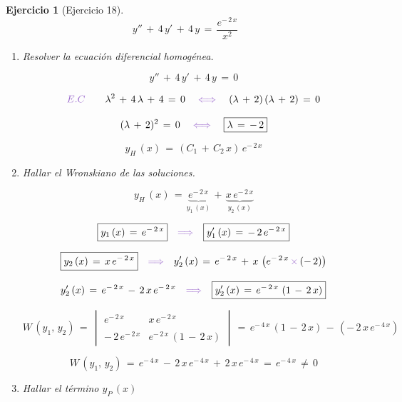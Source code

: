 \documentclass[a4paper,11pt, openany]{book}
\newtheorem{ejer}{Ejercicio}[section]
\newcommand*{\itembolasazules}[1]{%
\footnotesize\protect\tikz[baseline=-3pt]%
\protect\node[scale=.7, circle, shade, ball
color=green]{\color{white}\Large\bf#1};}
\begin{document}
\begin{ejer}[Ejercicio 18]

$$y''\,+\,4\,y'\,+\,4\,y\,=\,\dfrac{e^{-\,2\,x}}{x^{2}}$$
 
\begin{enumerate}[label=\itembolasazules{\arabic*}]
 
 
\item  Resolver la ecuación diferencial homogénea.
 
$$y''\,+\,4\,y'\,+\,4\,y\,=\,0$$
 
$$\textcolor{amethyst}{E.C} \qquad \lambda^{2}\,+\,4\,\lambda\,+\,4\,=\,0 \quad \textcolor{amethyst}{\iff} \quad (\lambda\,+\,2)\,(\lambda\,+\,2)\,=\,0$$
 
$$(\lambda\,+\,2)^{2}\,=\,0 \quad \textcolor{amethyst}{\iff} \quad
\boxed{\lambda\,=\,-\,2}$$
 
$$\boxed{y_{H}\,(x)\,=\,(C_{1}\,+\,C_{2}\,x)\,e^{-\,2\,x}}$$
 
\item Hallar el Wronskiano de las soluciones.
 
$$y_{H}\,(x)\,=\,\underbrace{e^{-\,2\,x}}_{y_{1}\,(x)}\,+\,\underbrace{x\,e^{-\,2\,x}}_{y_{2}\,(x)}$$
 
$$\boxed{y_{1}\,(x)\,=\,e^{-\,2\,x}} \quad \textcolor{amethyst}{\Longrightarrow} \quad \boxed{y_{1}'\,(x)\,=\,-\,2\,e^{-\,2\,x}}$$
 
$$\boxed{y_{2}\,(x)\,=\,x\,e^{-\,2\,x}} \quad \textcolor{amethyst}{\Longrightarrow} \quad y_{2}'\,(x)\,=\,e^{-\,2\,x}\,+\,x\,\left(e^{-\,2\,x}\,\textcolor{amethyst}{\times}\,(-\,2) \right) $$
 
$$y_{2}'\,(x)\,=\,e^{-\,2\,x}\,-\,2\,x\,e^{-\,2\,x} \quad \textcolor{amethyst}{\Longrightarrow} \quad \boxed{y_{2}'\,(x)\,=\,e^{-\,2\,x}\,\left(1\,-\,2\,x \right)}$$
 
$$W\,\left(y_{1},\,y_{2} \right)\,=\,\begin{vmatrix}
e^{-\,2\,x} & x\,e^{-\,2\,x} \\
\\
-\,2\,e^{-\,2\,x} & e^{-\,2\,x}\,(1\,-\,2\,x)
\end{vmatrix}\,=\,e^{-\,4\,x}\,(1\,-\,2\,x)\,-\,\left(-\,2\,x\,e^{-\,4\,x} \right)$$
 
$$W\,\left(y_{1},\,y_{2} \right)\,=\,e^{-\,4\,x}\,-\,2\,x\,e^{-\,4\,x}\,+\,2\,x\,e^{-\,4\,x}\,=\,\boxed{e^{-\,4\,x}\,\neq\,0}$$
 
\item Hallar el término $y_{P}\,(x)$
 

\end{enumerate}
\end{ejer}
\end{document}
